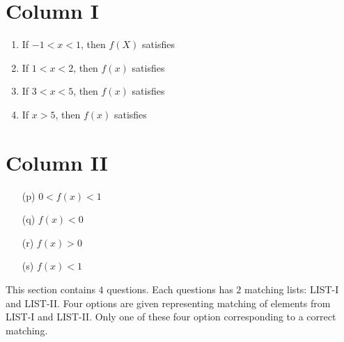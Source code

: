 \documentclass[journal,12pt,twocolumn]{IEEEtran}
\theoremstyle{remark}
\begin{document}
			              \begin{multicols}{2}
					      \section*{ Column I}
						\begin{enumerate}[label=(\Alph*)]
							\item If $-1<x<1$, then $f(X)$ satisfies
							\item If $1<x<2$, then $f(x)$ satisfies
							\item If $3<x<5$, then $f(x)$ satisfies
							\item If $x>5$, then $f(x)$ satisfies
						\end{enumerate}
						\columnbreak
						\section{ Column II}
						\begin{enumerate}
							\item[(p)] $0<f(x)<1$
							\item[(q)] $f(x)<0$
							\item[(r)] $f(x)>0$
							\item[(s)] $f(x)<1$
						\end{enumerate}
					\end{multicols}

\hline

This section contains $4$ questions. Each questions has $2$ matching lists: LIST-I and LIST-II. Four options are given representing matching of elements from LIST-I and LIST-II. Only one of these four option corresponding to a correct matching.
\hline
\end{document}
